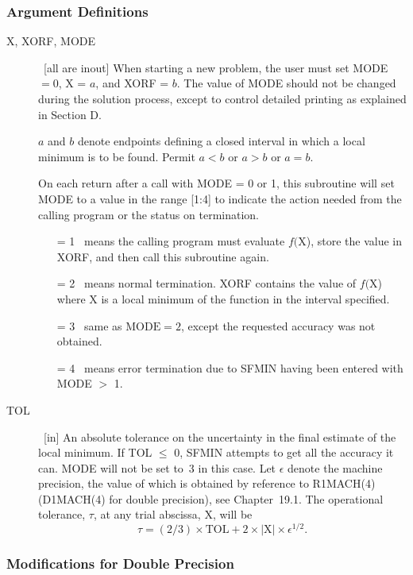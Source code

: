 \documentclass[twoside]{MATH77}
\begin{document}
\subsubsection{Argument Definitions}
\begin{description}
\item[X, XORF, MODE]  \ [all are inout] When starting a new problem, the
user must set MODE $=0$, X = $a$, and XORF = $b$. The value of MODE should not
be changed during the solution process, except to control detailed printing as
explained in Section D.

$a$ and $b$ denote endpoints defining a closed interval in which a local minimum
is to be found. Permit $a < b$ or $a > b$ or $a = b$.

On each return after a call with MODE = 0 or 1, this subroutine will set
MODE to a value in the range [1:4] to indicate the action needed from the
calling program or the status on termination.
\begin{itemize}
\item[= 1]  \ means the calling program must evaluate $f($X), store the
value in XORF, and then call this subroutine again.
\item[= 2]  \ means normal termination. XORF contains the value of $f($X)
where X is a local minimum of the function in the interval specified.
\item[= 3]  \ same as $\text{MODE}=2$, except the requested accuracy was not
obtained.
\item[= 4]  \ means error termination due to SFMIN having been entered with
MODE $>$ 1.
\end{itemize}
\item[TOL]  \ [in] An absolute tolerance on the uncertainty in the final
estimate of the local minimum. If TOL $\leq $ 0, SFMIN attempts to get
all the accuracy it can. MODE will not be set to~3 in this case. Let $%
\epsilon $ denote the machine precision, the value of which is obtained
by reference to R1MACH(4) (D1MACH(4) for double precision), see
Chapter~19.1. The operational tolerance, $\tau $, at any trial abscissa, X,
will be
\begin{equation*}
\tau =(2/3)\times \text{TOL}+2\times |\text{X}|\times \epsilon ^{1/2}.
\end{equation*}
\end{description}
\subsubsection{Modifications for Double Precision}
\end{document}
